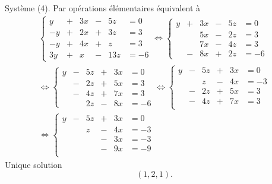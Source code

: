 Système (4). Par opérations élémentaires équivalent à
\begin{multline*}
  \left\lbrace 
  \begin{alignedat}{4}
    y &+& 3x &-& 5z &= 0\\
   -y &+& 2x &+& 3z &= 3\\
   -y &+& 4x &+& z  &= 3\\
   3y &+&  x &-& 13z &= -6
  \end{alignedat}
  \right.
\Leftrightarrow
  \left\lbrace 
  \begin{alignedat}{4}
    y &+& 3x &-& 5z &= 0\\
      & & 5x &-& 2z &= 3\\
      & & 7x &-& 4z &= 3\\
      &-& 8x &+& 2z &= -6
  \end{alignedat}
  \right. \\
  \Leftrightarrow
  \left\lbrace 
  \begin{alignedat}{4}
    y &-& 5z &+& 3x &= 0\\
      &-& 2z &+& 5x &= 3\\
      &-& 4z &+& 7x &= 3\\
      & & 2z &-& 8x &= -6
  \end{alignedat}
  \right.
  \Leftrightarrow
  \left\lbrace 
  \begin{alignedat}{4}
    y &-& 5z &+& 3x &= 0\\
      & & z  &-& 4x &= -3 \\
      &-& 2z &+& 5x &= 3\\
      &-& 4z &+& 7x &= 3\\
  \end{alignedat}
  \right. \\
  \Leftrightarrow
  \left\lbrace 
  \begin{alignedat}{4}
    y &-& 5z &+& 3x &= 0\\
      & & z  &-& 4x &= -3 \\
      & &    &-& 3x &= -3\\
      & &    &-& 9x &= -9\\
  \end{alignedat}
  \right.
\end{multline*}
Unique solution
\[
  (1,2,1).
\]
